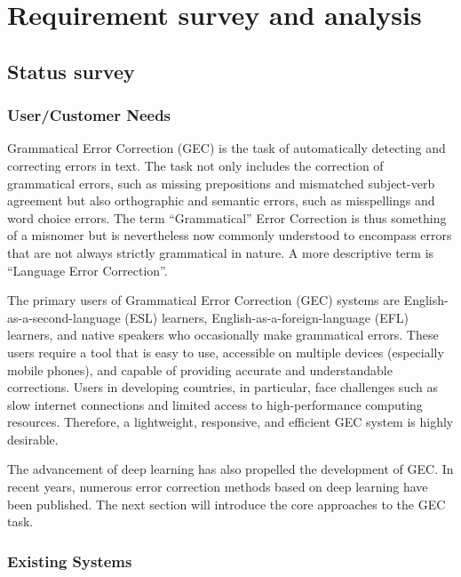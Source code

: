 \chapter{Requirement survey and analysis}
\label{chapter:requirement}

\section{Status survey}
\label{status-survey}

\subsection{User/Customer Needs}
\label{usercustomer-needs}

Grammatical Error Correction (GEC) is the task of automatically detecting and correcting errors in text.
The task not only includes the correction of grammatical errors, such as missing prepositions and mismatched subject-verb agreement but also orthographic and semantic errors, such as misspellings and word choice errors.
The term ``Grammatical'' Error Correction is thus something of a misnomer but is nevertheless now commonly understood to encompass errors that are not always strictly grammatical in nature.
A more descriptive term is ``Language Error Correction''.

The primary users of Grammatical Error Correction (GEC) systems are English-as-a-second-language (ESL) learners, English-as-a-foreign-language (EFL) learners, and native speakers who occasionally make grammatical errors.
These users require a tool that is easy to use, accessible on multiple devices (especially mobile phones), and capable of providing accurate and understandable corrections.
Users in developing countries, in particular, face challenges such as slow internet connections and limited access to high-performance computing resources.
Therefore, a lightweight, responsive, and efficient GEC system is highly desirable.

The advancement of deep learning has also propelled the development of GEC.
In recent years, numerous error correction methods based on deep learning have been published.
The next section will introduce the core approaches to the GEC task.

\subsection{Existing Systems}
\label{existing-systems}

